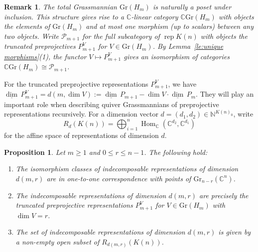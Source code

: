 \documentclass{amsart}
\newtheorem{proposition}[theorem]{Proposition}
\newtheorem{remark}[theorem]{Remark}
\numberwithin{equation}{section}
\newcommand{\CC}{\mathbb{C}}
\newcommand{\NN}{\mathbb{N}}
\newcommand{\cP}{\mathcal{P}}
\newcommand\udim{{\underline{\dim}\, }}
\newcommand{\Gr}{\mathrm{Gr}}
\newcommand{\Hom}{\operatorname{Hom}}
\newcommand{\rep}{\operatorname{rep}}
\begin{document}
\begin{remark}
  The total Grassmannian $\Gr(H_m)$ is naturally a poset under inclusion.
  This structure gives rise to a $\CC$-linear category $\CC \Gr(H_m)$ with objects the elements of $\Gr(H_m)$ and at most one morphism (up to scalars) between any two objects.
  Write $\cP_{m+1}$ for the full subcategory of $\rep K(n)$ with objects the truncated preprojectives $P_{m+1}^V$ for $V\in \Gr(H_m)$.
  By Lemma~\ref{le:unique morphisms}(1), the functor $V\mapsto P_{m+1}^V$ gives an isomorphism of categories $\CC \Gr(H_m)\cong\cP_{m+1}$.
\end{remark}
For the truncated preprojective representations $P_{m+1}^V$, we have  $\udim P_{m+1}^V=d(m,\dim V):=\udim P_{m+1}-\dim V\cdot\udim P_m$. They will play an important role when describing quiver Grassmannians of preprojective representations recursively. For a dimension vector $d=(d_1,d_2)\in\NN^{K(n)_0}$, write $$R_d(K(n))=\bigoplus_{i=1}^n\Hom_{\CC}(\CC^{d_2},\CC^{d_1})$$ for the affine space of representations of dimension $d$. 
\begin{proposition}
  \label{pro:indecomposables}
  Let $m\geq 1$ and $0\le r\le n-1$.
  The following hold:
  \begin{enumerate}
    \item The isomorphism classes of indecomposable representations of dimension $d(m,r)$ are in one-to-one correspondence with points of $\Gr_{n-r}(\CC^n)$.
    \item The indecomposable representations of dimension $d(m,r)$ are precisely the truncated preprojective representations $P_{m+1}^V$ for $V\in \Gr(H_m)$ with $\dim V=r$. 
    \item The set of indecomposable representations of dimension $d(m,r)$ is given by a non-empty open subset of $R_{d(m,r)}(K(n))$. 
  \end{enumerate}
\end{proposition}
\end{document}
